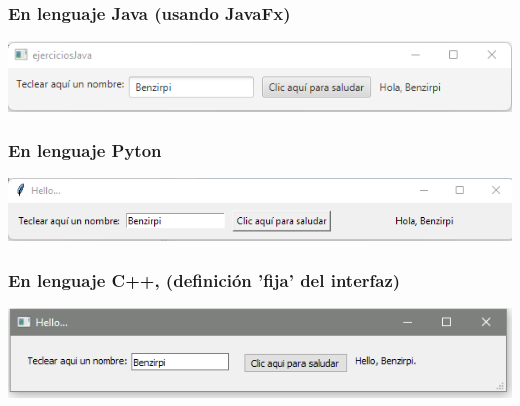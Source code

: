 \documentclass[spanish,12pt,a4paper,final,oneside]{book}
\begin{document}
\subsubsection*{En lenguaje Java (usando JavaFx)} \lstset{language=Java} 
\includegraphics[width=\textwidth]{HelloBenzirpi - pantallazo - JavaFx}



\vspace{1cm}
\subsubsection*{En lenguaje Pyton} \lstset{language=Python} 
\includegraphics[width=\textwidth]{HelloBenzirpi - pantallazo - Python}


\vspace{1cm}
\subsubsection*{En lenguaje C++, (definición 'fija' del interfaz)} \lstset{language=C++} 
\includegraphics[width=\textwidth]{HelloBenzirpi - pantallazo - C++}




\vspace{1cm}
\end{document}
